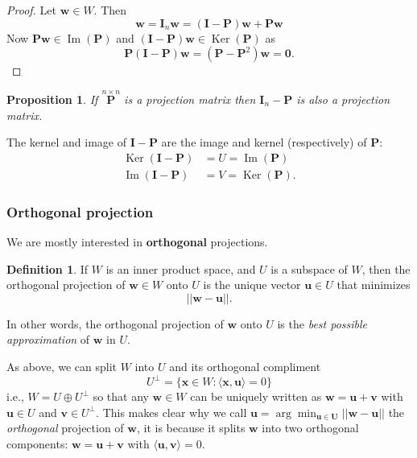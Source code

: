 \documentclass[
]{book}
\newtheorem{proposition}{Proposition}[chapter]
\theoremstyle{definition}
\newtheorem{definition}{Definition}[chapter]
\theoremstyle{definition}
\theoremstyle{definition}
\theoremstyle{definition}
\theoremstyle{remark}
\begin{document}
\begin{proof}
Let \(\mathbf w\in W\). Then
\[\mathbf w= \mathbf I_n \mathbf w=(\mathbf I-\mathbf P)\mathbf w+ \mathbf P\mathbf w\]
Now \(\mathbf P\mathbf w\in \operatorname{Im}(\mathbf P)\) and \((\mathbf I-\mathbf P)\mathbf w\in \operatorname{Ker}(\mathbf P)\) as
\[\mathbf P(\mathbf I-\mathbf P)\mathbf w= (\mathbf P-\mathbf P^2)\mathbf w=\boldsymbol 0.\]
\end{proof}

\begin{proposition}
\protect\hypertarget{prp:projIP}{}{\label{prp:projIP} }If \(\stackrel{n \times n}{\mathbf P}\) is a projection matrix then \({\mathbf I}_n - \mathbf P\) is also
a projection matrix.
\end{proposition}
The kernel and image of \(\mathbf I-\mathbf P\) are the image and kernel (respectively) of \(\mathbf P\):
\begin{align*}
\operatorname{Ker}(\mathbf I-\mathbf P) &= U=\operatorname{Im}(\mathbf P)\\
\operatorname{Im}(\mathbf I-\mathbf P) &= V=\operatorname{Ker}(\mathbf P).
\end{align*}

\hypertarget{orthogproj}{%
\subsubsection{Orthogonal projection}\label{orthogproj}}

We are mostly interested in \textbf{orthogonal} projections.

\begin{definition}
\protect\hypertarget{def:orthogproj}{}{\label{def:orthogproj} }If \(W\) is an inner product space, and \(U\) is a subspace of \(W\), then the orthogonal projection of \(\mathbf w\in W\) onto \(U\) is the unique vector \(\mathbf u\in U\) that minimizes
\[||\mathbf w-\mathbf u||.\]
\end{definition}

In other words, the orthogonal projection of \(\mathbf w\) onto \(U\) is the \emph{best possible approximation} of \(\mathbf w\) in \(U\).

As above, we can split \(W\) into \(U\) and its orthogonal compliment
\[U^\perp = \{\mathbf x\in W: \langle \mathbf x,\mathbf u\rangle = 0\}\]
i.e., \(W=U \oplus U^\perp\) so that any \(\mathbf w\in W\) can be uniquely written as
\(\mathbf w=\mathbf u+\mathbf v\) with \(\mathbf u\in U\) and \(\mathbf v\in U^\perp\). This makes clear why we call \(\mathbf u= \arg \min_{\mathbf u\in \mathbf U} ||\mathbf w-\mathbf u||\) the \emph{orthogonal} projection of \(\mathbf w\), it is because it splits \(\mathbf w\) into two orthogonal components: \(\mathbf w= \mathbf u+\mathbf v\) with \(\langle \mathbf u, \mathbf v\rangle=0\).
\end{document}
